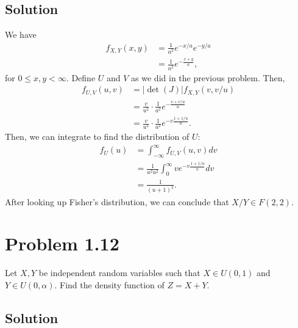 \documentclass[10pt,a4paper]{article}
\theoremstyle{theorem}
\theoremstyle{definition}
\begin{document}
\subsection*{Solution}
We have
\begin{align*}
f_{X, Y} (x, y) &= \frac{1}{a^2} e^{-x/a} e^{-y/a}\\
&= \frac{1}{a^2} e^{-\frac{x + y}{a}},
\end{align*}
for $0 \leq x, y < \infty$. Define $U$ and $V$ as we did in the previous problem. Then,
\begin{align*}
f_{U, V} (u, v) &= |\det(J)| f_{X, Y} (v, v/u)\\
&= \frac{v}{u^2} \cdot \frac{1}{a^2} e^{-\frac{v + v/u}{a}}\\
&=  \frac{v}{u^2} \cdot \frac{1}{a^2} e^{-v\frac{1 + 1/u}{a}}.
\end{align*}
Then, we can integrate to find the distribution of $U$:
\begin{align*}
f_U(u) &= \int_{- \infty}^\infty f_{U, V} (u, v) dv\\
&= \frac{1}{a^2 u^2} \int_{0}^\infty v e^{-v\frac{1 + 1/u}{a}} dv\\
&= \frac{1}{(u + 1)^2}.
\end{align*}
After looking up Fisher's distribution, we can conclude that $X/Y \in F(2, 2)$.


\section*{Problem 1.12}
Let $X, Y$ be independent random variables such that $X \in U(0, 1)$ and $Y \in U(0, \alpha)$. Find the density function of $Z = X + Y$.

\subsection*{Solution}
\end{document}
